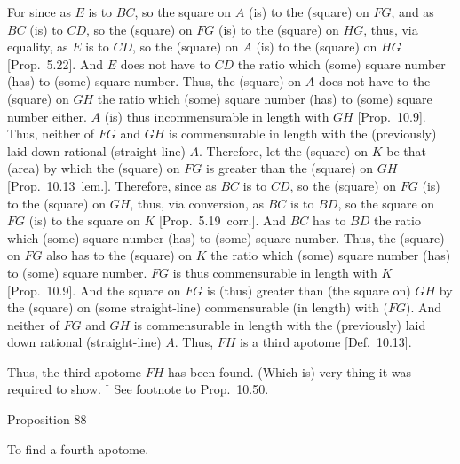 For since as $E$ is to $BC$, so the square on $A$ (is) to the (square)
on $FG$, and as $BC$ (is) to $CD$, so the (square) on $FG$
(is) to the (square) on $HG$, thus, via equality, as $E$ is to
$CD$, so the (square) on $A$ (is) to the (square) on $HG$ [Prop.~5.22]. And $E$ does not have to $CD$
the ratio which (some) square number (has) to (some) square number. Thus,
the (square) on $A$ does not have to the (square) on $GH$ the ratio
which (some) square number (has) to (some) square number either. 
$A$ (is) thus incommensurable in length with $GH$ [Prop.~10.9]. Thus, neither of $FG$ and $GH$
is commensurable in length with the (previously) laid down rational
(straight-line) $A$. Therefore, let the (square) on $K$ be that (area) by which the (square) on
$FG$ is greater than the (square) on $GH$ [Prop.~10.13~lem.]. Therefore, since as $BC$ is to
$CD$, so the (square) on $FG$ (is) to the (square) on $GH$, thus,
via conversion, as $BC$ is to $BD$, so the square on $FG$ (is) to the square on
$K$ [Prop.~5.19~corr.]. And $BC$ has to $BD$ the ratio which
(some) square number (has) to (some) square number. Thus, the (square)
on $FG$ also has to the (square) on $K$ the ratio which (some)
square number (has) to (some) square number.
$FG$ is thus commensurable in length with $K$ [Prop.~10.9]. And the square on $FG$ is (thus) greater
than (the square on) $GH$ by the (square) on (some straight-line)
commensurable (in length) with ($FG$). And neither of $FG$ and
$GH$ is commensurable in length with the (previously) laid down
rational (straight-line) $A$. Thus, $FH$ is a third
apotome [Def.~10.13].

Thus, the third apotome $FH$ has been found. (Which is) very thing
it was required to show.
{\footnotesize\noindent$^\dag$ See footnote
to Prop.~10.50.}


\begin{center}
{\large Proposition 88}
\end{center}

To find a fourth apotome.

\epsfysize=0.65in
\centerline{}

